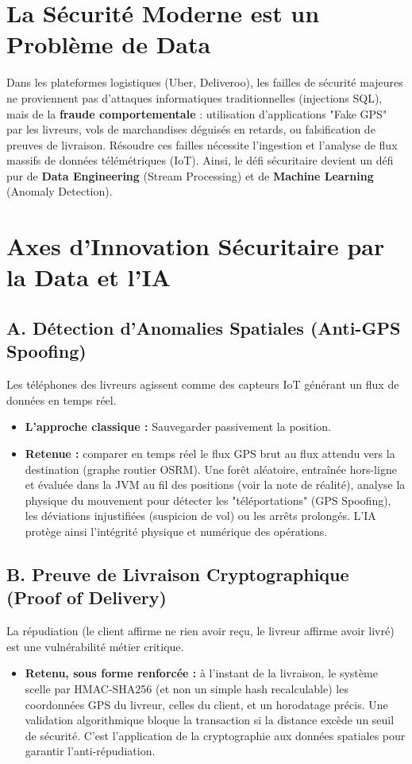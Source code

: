 \documentclass[11pt,a4paper]{article}
\begin{document}
\section{La Sécurité Moderne est un Problème de Data}
Dans les plateformes logistiques (Uber, Deliveroo), les failles de sécurité majeures ne proviennent pas d'attaques informatiques traditionnelles (injections SQL), mais de la \textbf{fraude comportementale} : utilisation d'applications "Fake GPS" par les livreurs, vols de marchandises déguisés en retards, ou falsification de preuves de livraison. 
Résoudre ces failles nécessite l'ingestion et l'analyse de flux massifs de données télémétriques (IoT). Ainsi, le défi sécuritaire devient un défi pur de \textbf{Data Engineering} (Stream Processing) et de \textbf{Machine Learning} (Anomaly Detection).

\section{Axes d'Innovation Sécuritaire par la Data et l'IA}

\subsection{A. Détection d'Anomalies Spatiales (Anti-GPS Spoofing)}
Les téléphones des livreurs agissent comme des capteurs IoT générant un flux de données en temps réel.
\begin{itemize}
    \item \textbf{L'approche classique :} Sauvegarder passivement la position.
    \item \textbf{Retenue :} comparer en temps réel le flux GPS brut au flux attendu vers la destination (graphe routier OSRM). Une forêt aléatoire, entraînée hors-ligne et évaluée dans la JVM au fil des positions (voir la note de réalité), analyse la physique du mouvement pour détecter les "téléportations" (GPS Spoofing), les déviations injustifiées (suspicion de vol) ou les arrêts prolongés. L'IA protège ainsi l'intégrité physique et numérique des opérations.
\end{itemize}

\subsection{B. Preuve de Livraison Cryptographique (Proof of Delivery)}
La répudiation (le client affirme ne rien avoir reçu, le livreur affirme avoir livré) est une vulnérabilité métier critique.
\begin{itemize}
    \item \textbf{Retenu, sous forme renforcée :} à l'instant de la livraison, le système scelle par HMAC-SHA256 (et non un simple hash recalculable) les coordonnées GPS du livreur, celles du client, et un horodatage précis. Une validation algorithmique bloque la transaction si la distance excède un seuil de sécurité. C'est l'application de la cryptographie aux données spatiales pour garantir l'anti-répudiation.
\end{itemize}
\end{document}
